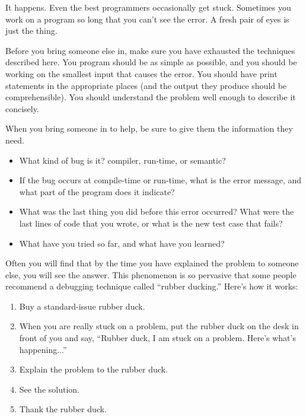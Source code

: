 \documentclass{book}
\begin{document}
It happens.  Even the best programmers occasionally get stuck.
Sometimes you work on a program so long that you can't see the
error.  A fresh pair of eyes is just the thing.

Before you bring someone else in, make sure you have exhausted
the techniques described here.  You program should be as simple
as possible, and you should be working on the smallest input
that causes the error.  You should have print statements in the
appropriate places (and the output they produce should be
comprehensible).  You should understand the problem well enough
to describe it concisely.

When you bring someone in to help, be sure to give
them the information they need.

\begin{itemize}

\item What kind of bug is it?  compiler, run-time, or
semantic?

\item If the bug occurs at compile-time or run-time, what is
the error message, and what part of the program does it indicate?

\item What was the last thing you did before this error occurred?
What were the last lines of code that you wrote, or what is
the new test case that fails?

\item What have you tried so far, and what have you learned? 

\end{itemize}

Often you will find that by the time you have explained the problem
to someone else, you will see the answer.  This phenomenon
is so pervasive that some people recommend a debugging technique
called ``rubber ducking.''  Here's how it works:

\begin{enumerate}

\item Buy a standard-issue rubber duck.

\item When you are really stuck on a problem, put the rubber
duck on the desk in front of you and say, ``Rubber duck, I
am stuck on a problem.  Here's what's happening...''

\item Explain the problem to the rubber duck.

\item See the solution.

\item Thank the rubber duck.

\end{enumerate}
\end{document}
